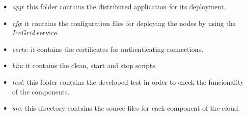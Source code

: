 \begin{itemize}

\item \emph{app}: this folder contains the distributed application for its
  deployment.
\item \emph{cfg}: it contains the configuration files for deploying the nodes
  by using the \emph{IceGrid} service.
\item \emph{certs}: it contains the certificates for authenticating connections.
\item \emph{bin}: it contains the clean, start and stop scripts.
\item \emph{test}: this folder contains the developed test in order to check the
  funcionality of the components.
\item \emph{src}: this directory contains the source files for each component of
  the cloud.
\end{itemize}

